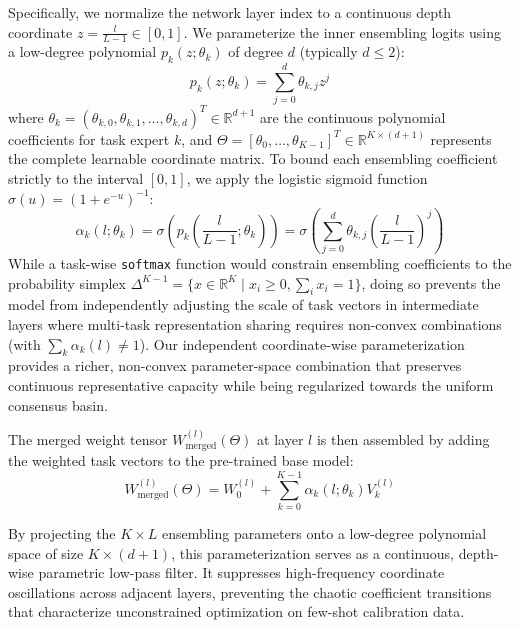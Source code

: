 Specifically, we normalize the network layer index to a continuous depth coordinate $z = \frac{l}{L-1} \in [0, 1]$. We parameterize the inner ensembling logits using a low-degree polynomial $p_k(z; \theta_k)$ of degree $d$ (typically $d \le 2$):
\begin{equation}
p_k(z; \theta_k) = \sum_{j=0}^d \theta_{k,j} z^j
\end{equation}
where $\theta_k = (\theta_{k,0}, \theta_{k,1}, \dots, \theta_{k,d})^T \in \mathbb{R}^{d+1}$ are the continuous polynomial coefficients for task expert $k$, and $\Theta = [\theta_0, \dots, \theta_{K-1}]^T \in \mathbb{R}^{K \times (d+1)}$ represents the complete learnable coordinate matrix. To bound each ensembling coefficient strictly to the interval $[0, 1]$, we apply the logistic sigmoid function $\sigma(u) = (1 + e^{-u})^{-1}$:
\begin{equation}
\alpha_k(l; \theta_k) = \sigma\left( p_k\left(\frac{l}{L-1}; \theta_k\right) \right) = \sigma\left( \sum_{j=0}^d \theta_{k,j} \left(\frac{l}{L-1}\right)^j \right)
\end{equation}
While a task-wise \texttt{softmax} function would constrain ensembling coefficients to the probability simplex $\Delta^{K-1} = \{x \in \mathbb{R}^K \mid x_i \ge 0, \sum_i x_i = 1\}$, doing so prevents the model from independently adjusting the scale of task vectors in intermediate layers where multi-task representation sharing requires non-convex combinations (with $\sum_k \alpha_k(l) \neq 1$). Our independent coordinate-wise parameterization provides a richer, non-convex parameter-space combination that preserves continuous representative capacity while being regularized towards the uniform consensus basin.

The merged weight tensor $W_{\text{merged}}^{(l)}(\Theta)$ at layer $l$ is then assembled by adding the weighted task vectors to the pre-trained base model:
\begin{equation}
W_{\text{merged}}^{(l)}(\Theta) = W_0^{(l)} + \sum_{k=0}^{K-1} \alpha_k(l; \theta_k) V_k^{(l)}
\end{equation}

By projecting the $K \times L$ ensembling parameters onto a low-degree polynomial space of size $K \times (d+1)$, this parameterization serves as a continuous, depth-wise parametric low-pass filter. It suppresses high-frequency coordinate oscillations across adjacent layers, preventing the chaotic coefficient transitions that characterize unconstrained optimization on few-shot calibration data.

